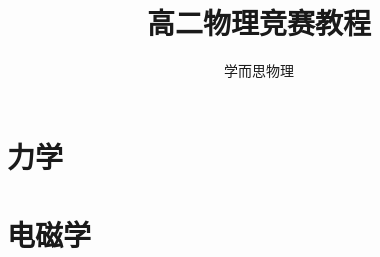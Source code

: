 \documentclass[krantz1,ChapterTOCs]{krantz}
\begin{document}
\frontmatter

\title{高二物理竞赛教程}
\author{学而思物理}

\maketitle

%
\tableofcontents
%
%
\listoffigures
\listoftables
%
%

\mainmatter




\part{力学}


















\part{电磁学}
\end{document}
